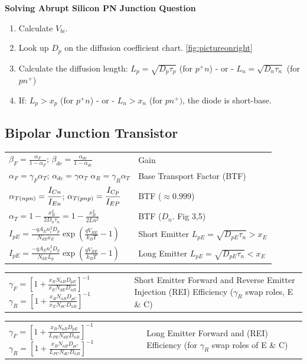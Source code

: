\begin{multicols}{3}
\textbf{Solving Abrupt Silicon PN Junction Question}

\begin{enumerate}
\item Calculate $V_{bi}$.
\item Look up $D_p$ on the diffusion coefficient chart. \ref{fig:pictureonright}
\item Calculate the diffusion length: $L_p = \sqrt{D_p \tau_p}$ (for $p^+n$) - or - $L_n=\sqrt{D_n \tau_n}$ (for $pn^+$)
\item If: $L_p > x_p $ (for $p^+n$) - or - $L_n > x_n$ (for $pn^+)$, the diode is short-base.
\end{enumerate}

\subsection{Bipolar Junction Transistor}

\begin{tabular}{p{5.30cm}p{3.5cm}}
$\beta_F = \frac{\alpha_F}{1-\alpha_F}$; $\beta_{dc}=\frac{\alpha_{dc}}{1-\alpha_{dc}}$ & Gain \\ %
$\alpha_F = \gamma_F \alpha_T$; $\alpha_{dc}=\gamma \alpha_T$ \hfill \break  $\alpha_R=\gamma_R \alpha_T$ & Base Transport \hfill \break  Factor (BTF) \\ %
$\alpha_{T(npn)}=\cfrac{I_{Cn}}{I_{En}}$; $\alpha_{T(pnp)}= \cfrac{I_{Cp}}{I_{EP}}$ & BTF ($\approx 0.999$) \\
$\alpha_T= 1-\frac{x_B^2}{2D_n\tau_n}=1-\frac{x_B^2}{2Ln^2}$ & BTF ($D_n$. Fig 3,5) \\
$I_{pE}= \frac{-qA_En_i^2 D_p}{N_{dE}x_E} \exp\left(\frac{qV_{BE}}{k_BT}-1\right)$ & Short Emitter \hfill \break 
$L_{pE}= \sqrt{D_{pE}\tau_n}>x_E$ \\
$I_{pE}= \frac{-qA_E n_i^2 D_p}{N_{dE}L_p} \exp\left(\frac{qV_{BE}}{k_BT}-1\right)$ & Long Emitter \hfill \break 
$L_{pE}= \sqrt{D_{pE}\tau_n}<x_E$ 
\end{tabular}
%
\begin{tabular}{p{3.8cm}p{5cm}}
$\gamma_F= \left[1+\frac{x_B N_{aB} D_{pE}}{x_E N_{dE} D_{nB}}\right]^{-1}$ 
$\gamma_R = \left[1+\frac{x_B N_{aB} D_{pC}}{x_E N_{dC} D_{nB}}\right]^{-1}$ & Short Emitter Forward and \hfill \break Reverse Emitter Injection (REI) \hfill \break Efficiency ($\gamma_R$ swap roles, E \& C) \\
%
\end{tabular}
%
\begin{tabular}{p{4.2cm}p{4.6cm}}
$\gamma_F= \left[1+\frac{x_B N_{aB} D_{pE}}{L_{PE} N_{dE} D_{nB}}\right]^{-1}$ 
$\gamma_R = \left[1+\frac{x_B N_{aB} D_{pC}}{L_{PC} N_{dC} D_{nB}}\right]^{-1}$ & Long Emitter Forward and \hfill \break (REI) Efficiency (for $\gamma_R$ swap roles of E \& C) \\
\end{tabular}


\end{multicols}

